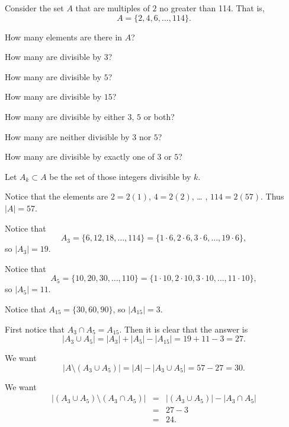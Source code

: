 \begin{exa}
Consider the set $A$ that are multiples of $2$ no greater than 114.  That is, 
$$A = \{2,4,6, \ldots , 114\}.$$
\begin{lenum}
\item 
How many elements are there in $A$?\item How many are
divisible by $3$? \item How many are divisible by $5$?  \item How
many are divisible by $15$? \item How many are divisible by either
$3$, $5$ or both? \item How many are neither divisible by $3$ nor
$5$? 
\item 
How many are divisible by exactly one of $3$ or $5$?
\end{lenum}
\begin{sol} Let $A_k \subset A$ be the set of those integers divisible by $k$.
\begin{lenum}
\item 
Notice that the elements are $2 = 2(1)$, $4 = 2(2)$, \ldots
, $114 = 2(57)$. Thus $|A| = 57.$ 
\item 
Notice that 
$$A_3=\{6, 12, 18, \ldots , 114\}=\{1\cdot 6,2\cdot 6, 3\cdot 6,\ldots, 19\cdot 6 \},$$ 
so $|A_3| = 19$.  
\item 
Notice that 
$$A_5=\{10, 20, 30,\ldots , 110\}=\{1\cdot 10,2\cdot 10, 3\cdot 10,\ldots, 11\cdot 10 \},$$ 
so $|A_5| = 11$.  
\item Notice that  
$A_{15}=\{30, 60, 90\}$, so $|A_{15}|=3$.
\item 
First notice that $A_3\cap A_5=A_{15}$.  Then it is clear that
the answer is 
$$|A_3 \cup A_5| = |A_3|+|A_5|-|A_{15}| = 19 + 11 -3= 27.$$ 
\item
We want
$$|A \setminus (A_3 \cup A_5)| = |A| - |A_3 \cup A_5| = 57 - 27 = 30.$$ 
\item We want
$$\begin{array}{lll}|(A_3 \cup A_5) \setminus (A_3 \cap A_5)|
& =  & |(A_3 \cup A_5)| - |A_3 \cap A_5|\\ &  = &  27 - 3
\\ & = &  24.\end{array}$$
\end{lenum}
\end{sol}
\end{exa}

